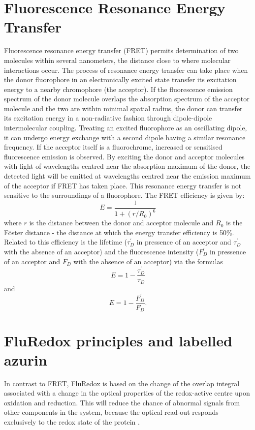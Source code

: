 \documentclass[twoside,single]{lion-msc}
\begin{document}
\section{Fluorescence Resonance Energy Transfer}
Fluorescence resonance energy transfer (FRET) permits determination of two molecules within several nanometers, the distance close to where molecular interactions occur. The process of resonance energy transfer can take place when the donor fluorophore in an electronically excited state transfer its excitation energy to a nearby chromophore (the acceptor). If the fluorescence emission spectrum of the donor molecule overlaps the absorption spectrum of the acceptor molecule and the two are within minimal spatial radius, the donor can transfer its excitation energy in a non-radiative fashion through dipole-dipole intermolecular coupling. Treating an excited fluorophore as an oscillating dipole, it can undergo energy exchange with a second dipole having a similar resonance frequency. If the acceptor itself is a fluorochrome, increased or sensitised fluorescence emission is observed. By exciting the donor and acceptor molecules with light of wavelengths centred near the absorption maximum of the donor, the detected light will be emitted at wavelengths centred near the emission maximum of the acceptor if FRET has taken place. This resonance energy transfer is not sensitive to the surroundings of a fluorophore. The FRET efficiency is given by:
\begin{equation}
E = \frac{1}{1 + (r/R_{0})^{6}}
\end{equation}
where $r$ is the distance between the donor and acceptor molecule and $R_{0}$ is the F\"oster distance - the distance at which the energy transfer efficiency is 50\%. Related to this efficiency is the lifetime ($\tau_{D}^{'}$ in pressence of an acceptor and $\tau_{D}^{'}$ with the absence of an acceptor) and the fluorescence intensity ($F_{D}^{'}$ in pressence of an acceptor and $F_{D}$ with the absence of an acceptor) via the formulas
\begin{equation}
E = 1 - \frac{\tau_{D}^{'}}{\tau_{D}}
\end{equation}
and
\begin{equation}
E = 1 - \frac{F_{D}^{'}}{F_{D}}.
\end{equation}


\section{FluRedox principles and labelled azurin}
In contrast to FRET, FluRedox is based on the change of the overlap integral associated with a change in the optical properties of the redox-active centre upon oxidation and reduction. This will reduce the chance of abnormal signals from other components in the system, because the optical read-out responds exclusively to the redox state of the protein \cite{Akklc}. 
\end{document}
